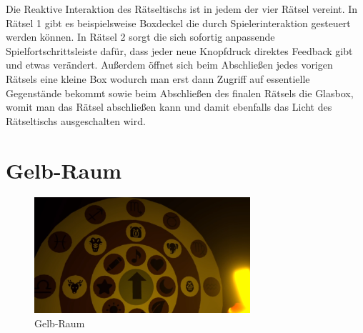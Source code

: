 \noindent Die Reaktive Interaktion des Rätseltischs ist in jedem der vier Rätsel vereint. In Rätsel 1 gibt es beispielsweise Boxdeckel die durch Spielerinteraktion gesteuert werden können. In Rätsel 2 sorgt die sich sofortig anpassende Spielfortschrittsleiste dafür, dass jeder neue Knopfdruck direktes Feedback gibt und etwas verändert. Außerdem öffnet sich beim Abschließen jedes vorigen Rätsels eine kleine Box wodurch man erst dann Zugriff auf essentielle Gegenstände bekommt sowie beim Abschließen des finalen Rätsels die Glasbox, womit man das Rätsel abschließen kann und damit ebenfalls das Licht des Rätseltischs ausgeschalten wird.
\newpage
\noindent
\section{Gelb-Raum}
\begin{figure}
	\vspace*{-0.5cm}
	\includegraphics[width=8cm]{Pictures/Gelb-Raum}
	\caption{Gelb-Raum}
	\vspace*{-0.5cm}
	\label{fig:Gelb-Raum}
\end{figure}
